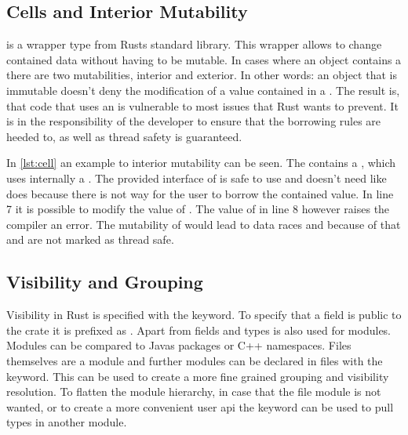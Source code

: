 \documentclass[thesis]{subfiles}
\begin{document}
  \subsection{Cells and Interior Mutability}\label{sec:cell}
    \UnsafeCellT is a wrapper type from Rusts standard library.
    This wrapper allows to change contained data without having to be mutable.
    In cases where an object contains a \UnsafeCellT there are two mutabilities, interior and exterior.
    In other words: an object that is immutable doesn't deny the modification of a value contained in a \UnsafeCellT.
    The result is, that code that uses an \UnsafeCellT is vulnerable to most issues that Rust wants to prevent.
    It is in the responsibility of the developer to ensure that the borrowing rules are heeded to, as well as thread safety is guaranteed.\autocite[std::cell]{rust-doc}


    In \autoref{lst:cell} an example to interior mutability can be seen.
    The \struct \Foo contains a \CellT, which uses internally a \UnsafeCellT.
    The provided interface of \CellT is safe to use and doesn't need \unsafe like \UnsafeCellT does because there is not way for the user to borrow the contained value.
    In line 7 it is possible to modify the value of \x.
    The value of \y in line 8 however raises the compiler an error.
    The mutability of \x would lead to data races and because of that \CellT and \RefCellT are not marked as thread safe\autocites[std::cell]{rust-doc}[Send and Sync]{rust-nom}.

  \subsection{Visibility and Grouping}
    Visibility in Rust is specified with the \pub keyword.
    To specify that a field is public to the crate it is prefixed as .
    Apart from fields and types \pub is also used for modules.
    Modules can be compared to Javas packages or C++ namespaces.
    Files themselves are a module and further modules can be declared in files with the \mod keyword.
    This can be used to create a more fine grained grouping and visibility resolution.
    To flatten the module hierarchy, in case that the file module is not wanted, or to create a more convenient user \gls{api} the \use keyword can be used to pull types in another module.
    \autocite[Visibility and Privacy, Use declarations]{rust-ref}
\end{document}
